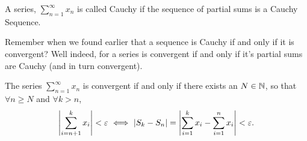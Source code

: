 \documentclass[12pt]{article}
\theoremstyle{definition}
\newcommand{\xseries}{\sum_{n = 1}^{\infty}x_{n}}
\begin{document}
            \begin{definition}
                A series, $\xseries$ is called Cauchy if the sequence of partial sums is a Cauchy Sequence.
            \end{definition}
            \begin{remark}
                Remember when we found earlier that a sequence is Cauchy if and only if it is convergent? Well indeed, for a series is convergent if and only if it's partial sums are Cauchy (and in turn convergent).
            \end{remark}
            \begin{prop}
                The series $\xseries$ is convergent if and only if there exists an $N \in \mathbb{N}$, so that $\forall n \geq N$ and $\forall k > n$, 
                \begin{equation*}
                    \left|\sum_{i = n + 1}^{k}x_{i}\right| < \varepsilon ~ \Longleftrightarrow ~ \left|S_{k} - S_{n}\right| = \left|\sum_{i = 1}^{k}x_{i} - \sum_{i = 1}^{n}x_{i}\right| < \varepsilon.
                \end{equation*}
            \end{prop}
\end{document}
